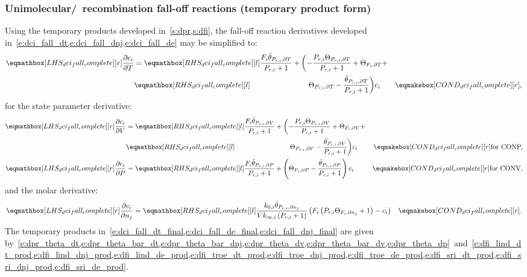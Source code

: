\documentclass[12pt,number,sort&compress]{elsarticle}
\newcommand{\conp}{CONP}
\newcommand{\conv}{CONV}
\newcommand{\dconp}{\ifmmode\text{for \conp,}\else for \conp,\fi}
\newcommand{\dconv}{\ifmmode\text{for \conv,}\else for \conv,\fi}
\begin{document}
\subsubsection{Unimolecular\slash~recombination fall-off reactions (temporary product form)}
\label{s:dfall_final}
Using the temporary products developed in~\cref{s:dpr,s:dfi}, the fall-off reaction derivatives developed in~\cref{e:dci_fall_dt,e:dci_fall_dnj,e:dci_fall_de} may be simplified to:
\begin{align}
\label{e:dci_fall_dt_final}
\lhs{dci_fall_complete}{\frac{\partial c_{i}}{\partial T }} &= \rhs{dci_fall_complete}{\frac{F_{i} \bar{\theta}_{P_{r, i}, \partial T}}{P_{r, i} + 1} + \biggl(- \frac{P_{r, i} \Theta_{P_{r,i}, \partial T}}{P_{r, i} + 1} + \Theta_{F_i, \partial T} + } & \nonumber \\
							     &  \rhs{dci_fall_complete}{\mathindent[largerindentpleas] \Theta_{P_{r,i}, \partial T} - \frac{\bar{\theta}_{P_{r, i}, \partial T}}{P_{r, i} + 1}\biggr) c_{i}} & \cond{dci_fall_complete}{,}
\end{align}
for the state parameter derivative:
\begin{subequations}
 \label{e:dci_fall_de_final}
 \begin{align}
  \lhs{dci_fall_complete}{\frac{\partial c_{i}}{\partial V }} &= \rhs{dci_fall_complete}{\frac{F_{i} \bar{\theta}_{P_{r, i}, \partial V}}{P_{r, i} + 1} + \biggl(- \frac{P_{r, i} \Theta_{P_{r,i}, \partial V}}{P_{r, i} + 1} + \Theta_{F_i, \partial V} + } & \nonumber \\
							       &  \rhs{dci_fall_complete}{\mathindent[largerindentpleas] \Theta_{P_{r,i}, \partial V} - \frac{\bar{\theta}_{P_{r, i}, \partial V}}{P_{r, i} + 1} \biggr) c_{i}} & \cond{dci_fall_complete}{\dconp} \\
  \lhs{dci_fall_complete}{\frac{\partial c_{i}}{\partial P }} &= \rhs{dci_fall_complete}{\frac{F_{i} \bar{\theta}_{P_{r, i}, \partial P}}{P_{r, i} + 1} + \left(\Theta_{F_i, \partial P} - \frac{\bar{\theta}_{P_{r, i}, \partial P}}{P_{r, i} + 1}\right) c_{i}} & \cond{dci_fall_complete}{\dconv}
 \end{align}
\end{subequations}
and the molar derivative:
\begin{align}
 \label{e:dci_fall_dnj_final}
\lhs{dci_fall_complete}{\frac{\partial c_{i} }{\partial {n_j} }} &= \rhs{dci_fall_complete}{\frac{k_{0, i} \bar{\theta}_{P_{r, i}, \partial n_j}}{V k_{\infty, i} \left(P_{r, i} + 1\right)} \left(F_{i} \left(P_{r, i} \Theta_{F_i, \partial n_j} + 1\right) - c_{i}\right)} & \cond{dci_fall_complete}{.}
\end{align}
The temporary products in~\cref{e:dci_fall_dt_final,e:dci_fall_de_final,e:dci_fall_dnj_final} are given by~\cref{e:dpr_theta_dt,e:dpr_theta_bar_dt,e:dpr_theta_bar_dnj,e:dpr_theta_dv,e:dpr_theta_bar_dv,e:dpr_theta_dp}~and~\cref{e:dfi_lind_dt_prod,e:dfi_lind_dnj_prod,e:dfi_lind_de_prod,e:dfi_troe_dt_prod,e:dfi_troe_dnj_prod,e:dfi_troe_de_prod,e:dfi_sri_dt_prod,e:dfi_sri_dnj_prod,e:dfi_sri_de_prod}.
\end{document}
